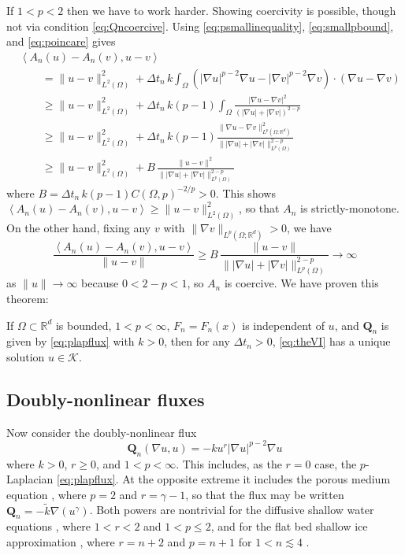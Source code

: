 \documentclass[final,leqno,onefignum,onetabnum]{siamltex1213bueler}
\newcommand\bQ{\mathbf{Q}}
\renewcommand{\grad}{\nabla}
\newcommand{\ip}[2]{\ensuremath{\left<#1,#2\right>}}
\newcommand\RR{\mathbb{R}}
\begin{document}
If $1<p<2$ then we have to work harder.  Showing coercivity is possible, though not via condition \eqref{eq:Qncoercive}.  Using \eqref{eq:psmallinequality}, \eqref{eq:smallpbound}, and \eqref{eq:poincare} gives
\begin{align*}
  &\ip{A_n(u) - A_n(v)}{u-v} \\
  &\qquad = \|u-v\|_{L^2(\Omega)}^2 + \Delta t_n\,k \int_\Omega \left(|\grad u|^{p-2} \grad u - |\grad v|^{p-2} \grad v\right)\cdot (\grad u - \grad v) \\
  &\qquad \ge \|u-v\|_{L^2(\Omega)}^2 + \Delta t_n\,k (p-1) \int_\Omega \frac{|\grad u - \grad v|^2}{\left(|\grad u|+|\grad v|\right)^{2-p}} \\
  &\qquad \ge \|u-v\|_{L^2(\Omega)}^2 + \Delta t_n\,k (p-1) \frac{\|\grad u - \grad v\|_{L^p(\Omega; \RR^d)}^2}{\big\||\grad u|+|\grad v|\big\|_{L^p(\Omega)}^{2-p}} \\
  &\qquad \ge \|u-v\|_{L^2(\Omega)}^2 + B\, \frac{\|u - v\|^2}{\big\||\grad u|+|\grad v|\big\|_{L^p(\Omega)}^{2-p}}
\end{align*}
where $B = \Delta t_n\,k (p-1) C(\Omega,p)^{-2/p} >0$.  This shows $\ip{A_n(u) - A_n(v)}{u-v} \ge \|u-v\|_{L^2(\Omega)}^2$, so that $A_n$ is strictly-monotone.  On the other hand, fixing any $v$ with $\|\grad v\|_{L^p(\Omega;\RR^d)} >0$, we have
\begin{equation*}
\frac{\ip{A_n(u) - A_n(v)}{u-v}}{\|u-v\|} \ge B\, \frac{\|u - v\|}{\big\||\grad u|+|\grad v|\big\|_{L^p(\Omega)}^{2-p}} \to \infty
\end{equation*}
as $\|u\|\to\infty$ because $0<2-p<1$, so $A_n$ is coercive.  We have proven this theorem:

\begin{theorem}  \label{thm:plapwellposed}  If $\Omega\subset \RR^d$ is bounded, $1<p<\infty$, $F_n=F_n(x)$ is independent of $u$, and $\bQ_n$ is given by \eqref{eq:plapflux} with $k>0$, then for any $\Delta t_n>0$, \eqref{eq:theVI} has a unique solution $u\in\mathcal{K}$.
\end{theorem}

\subsection{Doubly-nonlinear fluxes} \label{subsec:powertransform}  Now consider the doubly-nonlinear \cite{Raviart1970} flux
\begin{equation}
  \bQ_n(\grad u,u) = - k u^r |\grad u|^{p-2} \grad u \label{eq:doubleflux}
\end{equation}
where $k>0$, $r\ge 0$, and $1<p<\infty$.  This includes, as the $r=0$ case, the $p$-Laplacian \eqref{eq:plapflux}.  At the opposite extreme it includes the porous medium equation \cite{Vazquez2007}, where $p=2$ and $r=\gamma-1$, so that the flux may be written $\bQ_n = - \tilde k \grad(u^\gamma)$.  Both powers are nontrivial for the diffusive shallow water equations \cite{AlonsoSantillanaDawson2008}, where $1<r<2$ and $1<p\le 2$, and for the flat bed shallow ice approximation \cite{Bueleretal2005,Calvoetal2002,JouvetBueler2012}, where $r=n+2$ and $p=n+1$ for $1 < n \lesssim 4$ \cite{GoldsbyKohlstedt2001}.
\end{document}
